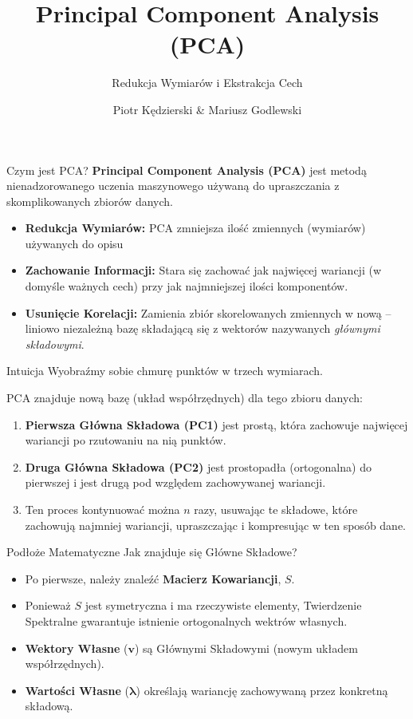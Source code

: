 \documentclass{beamer}
\title{Principal Component Analysis (PCA)}
\subtitle{Redukcja Wymiarów i Ekstrakcja Cech}
\author{Piotr Kędzierski \& Mariusz Godlewski}
\date{}
\begin{document}
	
	
	\begin{frame}
		\titlepage
	\end{frame}
	
	
	\begin{frame}{Czym jest PCA?}
		\textbf{Principal Component Analysis (PCA)} jest metodą nienadzorowanego uczenia maszynowego używaną do upraszczania z skomplikowanych zbiorów danych.
		
		\vspace{0.5cm}
		\begin{itemize}
			\item \textbf{Redukcja Wymiarów:} PCA zmniejsza ilość zmiennych (wymiarów) używanych do opisu 
			\item \textbf{Zachowanie Informacji:} Stara się zachować jak najwięcej wariancji (w domyśle ważnych cech) przy jak najmniejszej ilości komponentów.
			\item \textbf{Usunięcie Korelacji:} Zamienia zbiór skorelowanych zmiennych w nową -- liniowo niezależną bazę składającą się z wektorów nazywanych \textit{głównymi składowymi}.
		\end{itemize}
	\end{frame}
	
	
	\begin{frame}{Intuicja}
		Wyobraźmy sobie chmurę punktów w trzech wymiarach.
		
		\vspace{0.5cm}
		PCA znajduje nową bazę (układ współrzędnych) dla tego zbioru danych:
		\begin{enumerate}
			\item\textbf{Pierwsza Główna Składowa (PC1)} jest prostą, która zachowuje najwięcej wariancji po rzutowaniu na nią punktów.
			\item\textbf{Druga Główna Składowa (PC2)} jest prostopadła (ortogonalna) do pierwszej i jest drugą pod względem zachowywanej wariancji.
			\item Ten proces kontynuować można $n$ razy, usuwając te składowe, które zachowują najmniej wariancji, upraszczając i kompresując w ten sposób dane.
		\end{enumerate}
	\end{frame}
	
	
	\begin{frame}{Podłoże Matematyczne}
		Jak znajduje się Główne Składowe?
		
		\vspace{0.5cm}
		\begin{itemize}
			\item Po pierwsze, należy znaleźć \textbf{Macierz Kowariancji}, $S$.
			\item Ponieważ $S$ jest symetryczna i ma rzeczywiste elementy, Twierdzenie Spektralne gwarantuje istnienie ortogonalnych wektrów własnych.
			\item\textbf{Wektory Własne} ($\mathbf{v}$) są Głównymi Składowymi (nowym układem współrzędnych).
			\item\textbf{Wartości Własne} ($\mathbf{\lambda}$) określają wariancję zachowywaną przez konkretną składową.
		\end{itemize}
	\end{frame}
	
\end{document}
